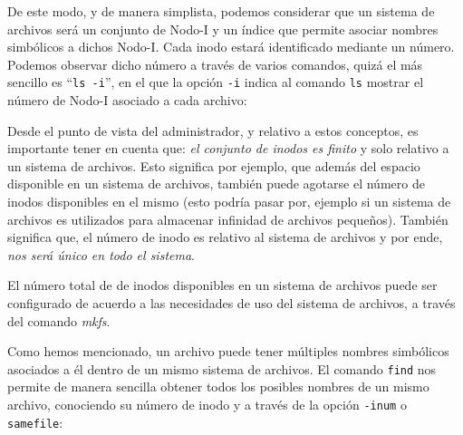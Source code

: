 \documentclass[12pt]{article}
\begin{document}
De este modo, y de manera simplista, podemos considerar que un sistema de 
archivos será un conjunto de Nodo-I y un índice que permite asociar nombres
simbólicos a dichos Nodo-I. Cada inodo estará identificado mediante un número.
Podemos observar dicho número a través de varios comandos, quizá el más 
sencillo es ``\texttt{ls -i}'', en el que la opción {\tt -i} indica al 
comando {\tt ls} mostrar el número de Nodo-I asociado a cada archivo: 


Desde el punto de vista del administrador, y relativo a estos conceptos, es
importante tener en cuenta que: \textit{el conjunto de inodos es finito} y 
solo relativo a un sistema de archivos. Esto significa por ejemplo, que 
además del espacio disponible en un sistema de archivos, también puede 
agotarse el número de inodos disponibles en el mismo (esto podría pasar por,
ejemplo si un sistema de archivos es utilizados para almacenar infinidad de
archivos pequeños). También significa que, el número de inodo es relativo 
al sistema de archivos y por ende, \textit{nos será único en todo el 
sistema}.   

El número total de de inodos disponibles en un sistema de archivos puede ser
configurado de acuerdo a las necesidades de uso del sistema de archivos, a
través del comando \textit{mkfs}.

Como hemos mencionado, un archivo puede tener múltiples nombres simbólicos
asociados a él dentro de un mismo sistema de archivos. El comando {\tt find}
nos permite de manera sencilla obtener todos los posibles nombres de un 
mismo archivo, conociendo su número de inodo y a través de la opción 
{\tt -inum} o {\tt samefile}:
\end{document}

